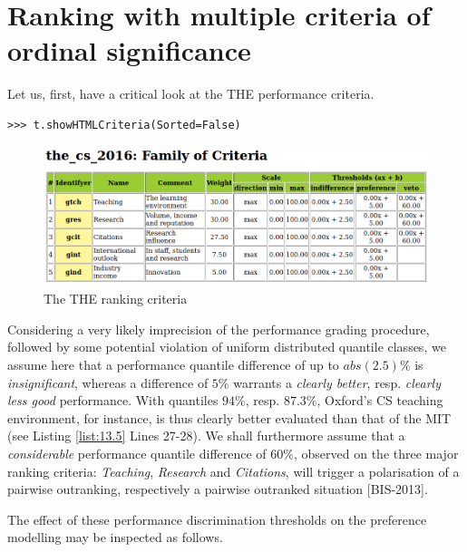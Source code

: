 \section{Ranking with multiple criteria of ordinal significance}
\label{sec:13.2}

Let us, first, have a critical look at the THE performance criteria.

\begin{lstlisting}
>>> t.showHTMLCriteria(Sorted=False)
\end{lstlisting}

\begin{figure}[h]
\includegraphics[width=12cm]{Figures/the_cs_2016Criteria.png}
\caption{The THE ranking criteria}
\label{fig:13.1}       %
\end{figure}

Considering a very likely imprecision of the performance grading procedure, followed by some potential violation of uniform distributed quantile classes, we assume here that a performance quantile difference of up to $abs(2.5)\%$ is \emph{insignificant}, whereas a difference of $5\%$ warrants a \emph{clearly better}, resp. \emph{clearly less good} performance. With quantiles $94\%$, resp. $87.3\%$, Oxford's CS teaching environment, for instance, is thus clearly better evaluated than that of the MIT (see Listing \ref{list:13.5} Lines 27-28). We shall furthermore assume that a \emph{considerable} performance quantile difference of $60\%$, observed on the three major ranking criteria: \emph{Teaching}, \emph{Research} and \emph{Citations}, will trigger a polarisation of a pairwise outranking, respectively a pairwise outranked situation [BIS-2013].

The effect of these performance discrimination thresholds on the preference modelling may be inspected as follows.

